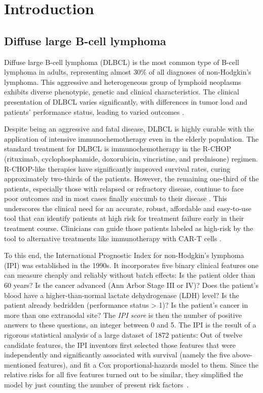 \chapter{Introduction} \label{chap:intro}

\section{Diffuse large B-cell lymphoma}

Diffuse large B-cell lymphoma (DLBCL) is the most common type of B-cell lymphoma in adults, 
representing almost 30\% of all diagnoses of non-Hodgkin's lymphoma. 
This aggressive and heterogeneous group of 
lymphoid neoplasms exhibits
diverse phenotypic, genetic and clinical characteristics. The clinical presentation of 
DLBCL varies significantly, with differences in tumor load and patients' performance status, leading 
to varied outcomes \cite{dlbcl-review21}.

Despite being an aggressive and fatal disease, DLBCL is highly curable with the 
application of intensive immunochemotherapy even in the elderly population. The standard treatment 
for DLBCL is immunochemotherapy in the R-CHOP (rituximab, cyclophosphamide, doxorubicin, 
vincristine, and prednisone) regimen. R-CHOP-like therapies
have significantly improved survival rates, curing approximately two-thirds of the patients. 
However, the remaining one-third of the patients, especially 
those with relapsed or refractory disease, continue to face poor outcomes and in most cases finally 
succumb to their disease \citep{glass17}. This underscores the clinical 
need for an accurate, robust, affordable and easy-to-use tool that can identify patients at high risk 
for treatment failure early in their treatment course. Clinicians can guide those patients labeled 
as high-risk by the tool to alternative treatments like immunotherapy with CAR-T cells 
\cite{wang20}.

To this end, the International Prognostic Index for non-Hodgkin's lymphoma (IPI) was established in 
the 1990s. It incorporates five binary clinical features one can measure cheaply and 
reliably without batch effects: Is the patient older than \num{60} years? Is the cancer advanced 
(Ann Arbor Stage III or IV)? Does the patient's blood have a higher-than-normal lactate dehydrogenase (LDH) 
level? Is the patient already 
bedridden (performance status > 1)? Is the patient's cancer in more than one extranodal site? The 
\textit{IPI score} is then the number of positive answers to these questions, an integer between 0 
and 5. The IPI is the result of a rigorous statistical analysis 
of a large dataset of \num{1872} patients: Out of twelve candidate features, the IPI inventors
first selected those features that were independently and significantly associated with survival 
(namely the five above-mentioned features), and fit a Cox proportional-hazards model to them.
Since the relative risks for all five features turned out to be similar, they simplified the model 
by just counting the number of present risk factors~\cite{ipi93}. 

